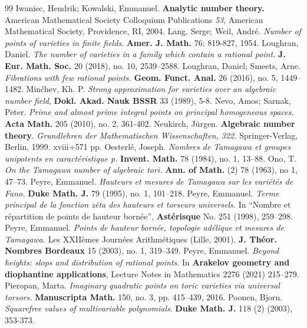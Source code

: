\documentclass[11pt,letterpaper]{amsart}
\theoremstyle{plain}
\numberwithin{equation}{section}
\theoremstyle{definition}
\theoremstyle{remark}
\begin{document}
\begin{thebibliography}{99}
	Iwaniec, Hendrik;  Kowalski, Emmanuel. \textbf{Analytic number theory.} American Mathematical Society Colloquium Publications {\em 53}, American Mathematical Society, Providence, RI, 2004.
	 Lang, Serge; Weil, Andr\'e. \emph{Number of points of varieties in finite fields}. \textbf{Amer. J. Math.} 76: 819-827, 1954.
	 Loughran, Daniel. \emph{The number of varieties in a family which contain a rational point.} \textbf{J. Eur. Math. Soc.} 20 (2018), no. 10, 2539–2588.
	 Loughran, Daniel; Smeets, Arne. \emph{Fibrations with few rational points.} \textbf{Geom. Funct. Anal. } 26 (2016), no. 5, 1449–1482.
	 Min\v{c}hev, Kh. P. \emph{Strong approximation for varieties over an algebraic number field}, \textbf{Dokl. Akad. Nauk BSSR} 33 (1989), 5-8.
	 Nevo, Amos; Sarnak, Peter. \emph{Prime and almost prime integral points on principal homogeneous spaces}. \textbf{Acta Math.} 205 (2010), no. 2, 361-402.  
	Neukirch, Jürgen. \textbf{Algebraic number theory}. \emph{Grundlehren der Mathematischen Wissenschaften, 322.} Springer-Verlag, Berlin, 1999. xviii+571 pp. 
	 Oesterlé, Joseph. \emph{Nombres de Tamagawa et groupes unipotents en caractéristique p.} \textbf{Invent. Math.} 78 (1984), no. 1, 13–88. 
	 Ono, T. \emph{On the Tamagawa number of algebraic tori.} \textbf{Ann. of Math.} (2) 78 (1963), no 1, 47–73.
	 Peyre, Emmanuel. \emph{Hauteurs et mesures de Tamagawa sur les variétés de Fano.} \textbf{Duke Math. J.} 79 (1995), no. 1, 101--218.
	 Peyre, Emmanuel. \emph{Terme principal de la fonction zêta des hauteurs et torseurs universels.} In ``Nombre et répartition de points de hauteur bornée'', \textbf{Astérisque} No. 251 (1998), 259–298. 
	 Peyre, Emmanuel. \emph{Points de hauteur bornée, topologie adélique et mesures de Tamagawa.} Les XXIIèmes Journées Arithm\'etiques (Lille, 2001). \textbf{J. Théor. Nombres Bordeaux} 15 (2003), no. 1, 319–349. 
	 Peyre, Emmanuel. \emph{Beyond heights: slops and distribution of rational points}. In \textbf{Arakelov geometry and diophantine applications}, Lecture Notes in Mathematics 2276 (2021) 215--279.
	 Pieropan, Marta. \emph{Imaginary quadratic points on toric varieties via universal torsors.} \textbf{Manuscripta Math.} 150, no. 3, pp. 415–439, 2016.
	  Poonen,  Bjorn. \emph{Squarefree values of multivariable polynomials}. \textbf{Duke Math. J.} 118 (2) (2003), 353-373.

\end{thebibliography}
\end{document}
